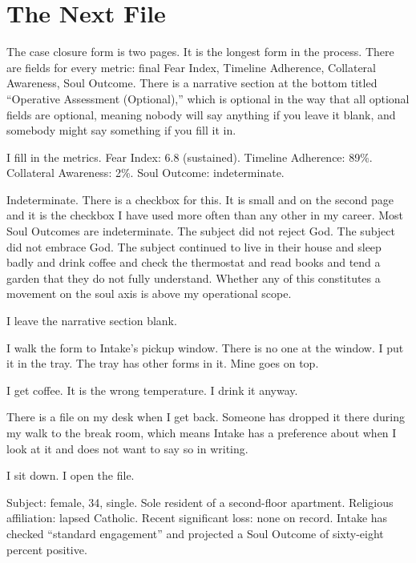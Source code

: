 
\chapter{The Next File}

The case closure form is two pages. It is the longest form in the process. There are fields for every metric: final Fear Index, Timeline Adherence, Collateral Awareness, Soul Outcome. There is a narrative section at the bottom titled ``Operative Assessment (Optional),'' which is optional in the way that all optional fields are optional, meaning nobody will say anything if you leave it blank, and somebody might say something if you fill it in.

I fill in the metrics. Fear Index: 6.8 (sustained). Timeline Adherence: 89\%. Collateral Awareness: 2\%. Soul Outcome: indeterminate.

Indeterminate. There is a checkbox for this. It is small and on the second page and it is the checkbox I have used more often than any other in my career. Most Soul Outcomes are indeterminate. The subject did not reject God. The subject did not embrace God. The subject continued to live in their house and sleep badly and drink coffee and check the thermostat and read books and tend a garden that they do not fully understand. Whether any of this constitutes a movement on the soul axis is above my operational scope.

I leave the narrative section blank.

I walk the form to Intake's pickup window. There is no one at the window. I put it in the tray. The tray has other forms in it. Mine goes on top.

I get coffee. It is the wrong temperature. I drink it anyway.

There is a file on my desk when I get back. Someone has dropped it there during my walk to the break room, which means Intake has a preference about when I look at it and does not want to say so in writing.

I sit down. I open the file.

Subject: female, 34, single. Sole resident of a second-floor apartment. Religious affiliation: lapsed Catholic. Recent significant loss: none on record. Intake has checked ``standard engagement'' and projected a Soul Outcome of sixty-eight percent positive.

